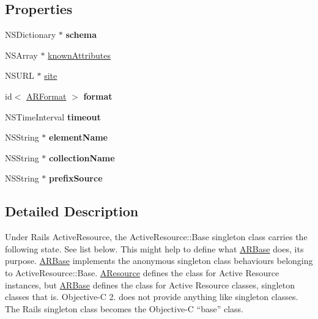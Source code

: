 \subsection*{\-Properties}
\begin{DoxyCompactItemize}
\item 
\hypertarget{a00001_a90a5f2ff51f15ba2bc36fc6758e7174c}{
\-N\-S\-Dictionary $\ast$ {\bfseries schema}}
\label{a00001_a90a5f2ff51f15ba2bc36fc6758e7174c}

\item 
\-N\-S\-Array $\ast$ \hyperlink{a00001_a56a8d73d2c0c3792d09a05b1f9588540}{known\-Attributes}
\item 
\-N\-S\-U\-R\-L $\ast$ \hyperlink{a00001_a41acdb2fabc743190d933890aa6e0f33}{site}
\item 
\hypertarget{a00001_a60e2982670a0a74d86826c2d4e7d011e}{
id$<$ \hyperlink{a00003}{\-A\-R\-Format} $>$ {\bfseries format}}
\label{a00001_a60e2982670a0a74d86826c2d4e7d011e}

\item 
\hypertarget{a00001_a8805a1ed23887536d301f4b7c60c2ee4}{
\-N\-S\-Time\-Interval {\bfseries timeout}}
\label{a00001_a8805a1ed23887536d301f4b7c60c2ee4}

\item 
\hypertarget{a00001_a7270c73ec630fa23e6c40127cad1d6b3}{
\-N\-S\-String $\ast$ {\bfseries element\-Name}}
\label{a00001_a7270c73ec630fa23e6c40127cad1d6b3}

\item 
\hypertarget{a00001_a6ff2e189e97fa9379fb6cee21d394d7a}{
\-N\-S\-String $\ast$ {\bfseries collection\-Name}}
\label{a00001_a6ff2e189e97fa9379fb6cee21d394d7a}

\item 
\hypertarget{a00001_a715c28f41031f99b4e763c52717f001c}{
\-N\-S\-String $\ast$ {\bfseries prefix\-Source}}
\label{a00001_a715c28f41031f99b4e763c52717f001c}

\end{DoxyCompactItemize}


\subsection{\-Detailed \-Description}
\-Under \-Rails \-Active\-Resource, the \-Active\-Resource\-::\-Base singleton class carries the following state. \-See list below. \-This might help to define what \hyperlink{a00001}{\-A\-R\-Base} does, its purpose. \hyperlink{a00001}{\-A\-R\-Base} implements the anonymous singleton class behaviours belonging to \-Active\-Resource\-::\-Base. \hyperlink{a00002}{\-A\-Resource} defines the class for \-Active \-Resource instances, but \hyperlink{a00001}{\-A\-R\-Base} defines the class for \-Active \-Resource classes, singleton classes that is. \-Objective-\/\-C 2. does not provide anything like singleton classes. \-The \-Rails singleton class becomes the \-Objective-\/\-C “base” class.

